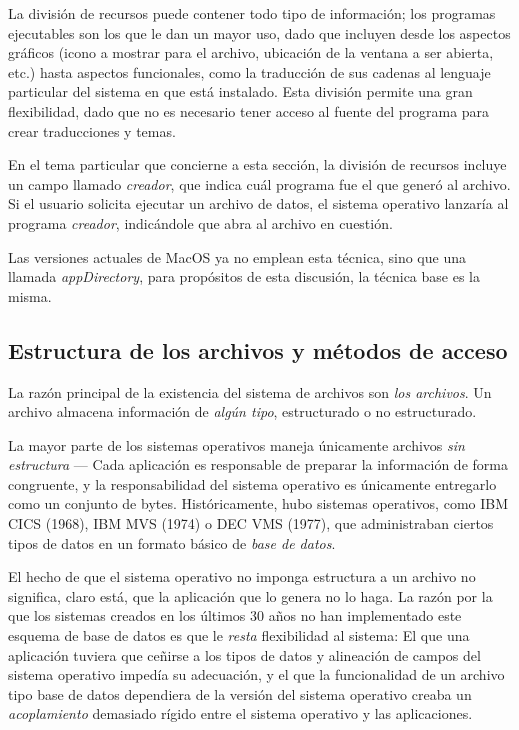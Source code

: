 \documentclass[11pt,fleqn]{book} %
\begin{document}
\begin{description}
     La división de recursos puede contener todo tipo de
     información; los programas ejecutables son los que le dan un
     mayor uso, dado que incluyen desde los aspectos gráficos (icono
     a mostrar para el archivo, ubicación de la ventana a ser
     abierta, etc.) hasta aspectos funcionales, como la traducción de
     sus cadenas al lenguaje particular del sistema en que está
     instalado. Esta división permite una gran flexibilidad, dado que
     no es necesario tener acceso al fuente del programa para crear
     traducciones y temas.

     En el tema particular que concierne a esta sección, la división
     de recursos incluye un campo llamado \emph{creador}, que indica cuál
     programa fue el que generó al archivo. Si el usuario solicita
     ejecutar un archivo de datos, el sistema operativo lanzaría al
     programa \emph{creador}, indicándole que abra al archivo en cuestión.

     Las versiones actuales de MacOS ya no emplean esta técnica, sino
     que una llamada \emph{appDirectory}, para propósitos de esta
     discusión, la técnica base es la misma.
\end{description}
\subsection{Estructura de los archivos y métodos de acceso}
\label{sec-6-2-5}
\label{DIR_archivos_estructurados}

La razón principal de la existencia del sistema de archivos son \emph{los archivos}. Un archivo almacena información de \emph{algún tipo},
estructurado o no estructurado.

La mayor parte de los sistemas operativos maneja únicamente archivos
\emph{sin estructura} — Cada aplicación es responsable de preparar la
información de forma congruente, y la responsabilidad del sistema
operativo es únicamente entregarlo como un conjunto de
bytes. Históricamente, hubo sistemas operativos, como IBM CICS (1968), IBM MVS
(1974) o DEC VMS (1977), que administraban ciertos tipos de datos en
un formato básico de \emph{base de datos}.

El hecho de que el sistema operativo no imponga estructura a un archivo no
significa, claro está, que la aplicación que lo genera no lo haga. La
razón por la que los sistemas creados en los últimos 30 años no han
implementado este esquema de base de datos es que le \emph{resta}
flexibilidad al sistema: El que una aplicación tuviera que ceñirse a
los tipos de datos y alineación de campos del sistema operativo
impedía su adecuación, y el que la funcionalidad de un archivo tipo
base de datos dependiera de la versión del sistema operativo creaba
un \emph{acoplamiento} demasiado rígido entre el sistema operativo y las
aplicaciones.
\end{document}
